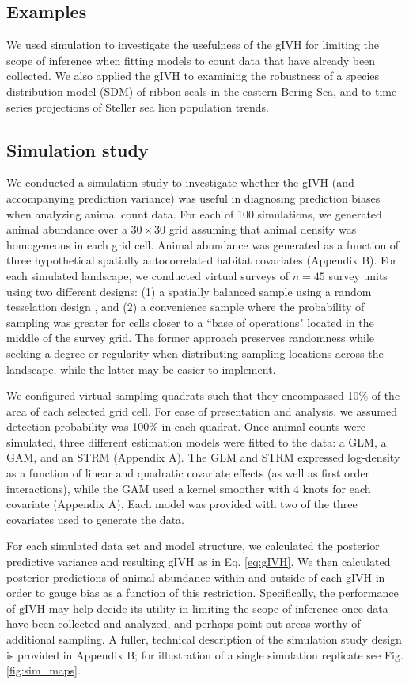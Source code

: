 \documentclass[12pt,english]{article}
\begin{document}
\begin{spacing}{1.9}
\section{Examples}

We used simulation to investigate the usefulness of the gIVH for limiting the scope of inference when fitting models to count data that have already been collected.  We also applied the gIVH to examining the robustness of a species distribution model (SDM) of ribbon seals in the eastern Bering Sea, and to time series projections of Steller sea lion population trends.

\subsection{Simulation study}


We conducted a simulation study to investigate whether the gIVH (and accompanying prediction variance) was useful in diagnosing prediction biases when analyzing animal count data. For each of 100 simulations, we generated animal abundance over a $30 \times 30$ grid assuming that animal density was homogeneous in each grid cell.  Animal abundance was generated as a function of three hypothetical spatially autocorrelated habitat covariates (Appendix B).   For each simulated landscape, we conducted virtual surveys of $n=45$ survey units using two different designs: (1) a spatially balanced sample using a random tesselation design \citep{StevensOlsen2004}, and (2) a convenience sample where the probability of sampling was greater for cells closer to a ``base of operations" located in the middle of the survey grid. The former approach preserves randomness while seeking a degree or regularity when distributing sampling locations across the landscape, while the latter may be easier to implement.

We configured virtual sampling quadrats such that they encompassed 10\% of the area of each selected grid cell.  For ease of presentation and analysis, we assumed detection probability was 100\% in each quadrat.  Once animal counts were simulated, three different estimation models were fitted to the data: a GLM, a GAM, and an STRM (Appendix A).  The GLM and STRM expressed log-density as a function of linear and quadratic covariate effects (as well as first order interactions), while the GAM used a kernel smoother with 4 knots for each covariate (Appendix A).  Each model was provided with two of the three covariates used to generate the data.

For each simulated data set and model structure, we calculated the posterior predictive variance and resulting $\text{gIVH}$ as in Eq. \ref{eq:gIVH}. We then calculated posterior predictions of animal abundance within and outside of each gIVH in order to gauge bias as a function of this restriction.  Specifically, the performance of $\text{gIVH}$ may help decide its utility in limiting the scope of inference once data have been collected and analyzed, and perhaps point out areas worthy of additional sampling.  A fuller, technical description of the simulation study design is provided in Appendix B; for illustration of a single simulation replicate see Fig. \ref{fig:sim_maps}.


\end{spacing}
\end{document}
